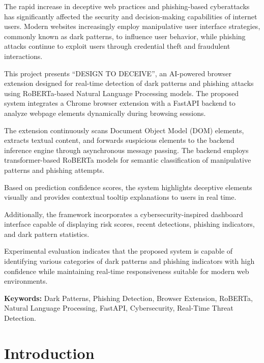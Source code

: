 \documentclass[12pt,a4paper]{report}
\begin{document}
The rapid increase in deceptive web practices and phishing-based cyberattacks has significantly affected the security and decision-making capabilities of internet users. Modern websites increasingly employ manipulative user interface strategies, commonly known as dark patterns, to influence user behavior, while phishing attacks continue to exploit users through credential theft and fraudulent interactions.

This project presents ``DESIGN TO DECEIVE'', an AI-powered browser extension designed for real-time detection of dark patterns and phishing attacks using RoBERTa-based Natural Language Processing models. The proposed system integrates a Chrome browser extension with a FastAPI backend to analyze webpage elements dynamically during browsing sessions.

The extension continuously scans Document Object Model (DOM) elements, extracts textual content, and forwards suspicious elements to the backend inference engine through asynchronous message passing. The backend employs transformer-based RoBERTa models for semantic classification of manipulative patterns and phishing attempts.

Based on prediction confidence scores, the system highlights deceptive elements visually and provides contextual tooltip explanations to users in real time.

Additionally, the framework incorporates a cybersecurity-inspired dashboard interface capable of displaying risk scores, recent detections, phishing indicators, and dark pattern statistics.

Experimental evaluation indicates that the proposed system is capable of identifying various categories of dark patterns and phishing indicators with high confidence while maintaining real-time responsiveness suitable for modern web environments.

\vspace{0.5cm}
\textbf{Keywords:} Dark Patterns, Phishing Detection, Browser Extension, RoBERTa, Natural Language Processing, FastAPI, Cybersecurity, Real-Time Threat Detection.

\tableofcontents
\newpage

\chapter{Introduction}
\end{document}
